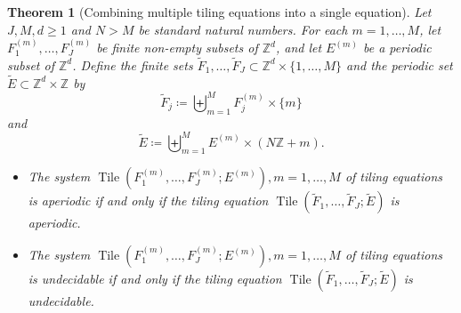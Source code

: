 \documentclass[reqno,a4paper,12pt]{amsart}
\numberwithin{equation}{section}
\numberwithin{figure}{section}
\def\Z{\mathbb{Z}}
\renewcommand\geq{\geqslant}
\newcommand{\Tile}{\operatorname{Tile}}
\theoremstyle{plain}
\newtheorem{theorem}[thm]{Theorem}
\theoremstyle{definition}
\begin{document}
\begin{theorem}[Combining multiple tiling equations into a single equation]\label{combine'}  Let $J,M,d \geq 1$ and $N>M$ be standard natural numbers.  
For each $m=1,\dots,M$, let $F_1^{(m)},\dots,F_J^{(m)}$ be finite non-empty subsets of $\Z^d$, and let $E^{(m)}$ be a periodic subset of $\Z^d$.  Define the finite sets $\tilde F_1,\dots,\tilde F_J \subset \Z^d \times \{1,\dots, M\}$ and the periodic set $\tilde E \subset \Z^d \times \Z$ by 
\begin{equation}\label{fj-stack'}
 \tilde F_j \coloneqq \biguplus_{m=1}^M F_j^{(m)} \times \{m\}
 \end{equation}
and
\begin{equation}\label{e0-stack'}
 \tilde E \coloneqq  \biguplus_{m=1}^M E^{(m)} \times (N\Z+m ).
 \end{equation}
\begin{itemize}
\item[(i)]  The system $\Tile(F_1^{(m)},\dots,F_J^{(m)}; E^{(m)}), m=1,\dots,M$ of tiling equations is aperiodic if and only if the tiling equation
$\Tile(\tilde F_1,\dots,\tilde F_J; \tilde E)$ is aperiodic.
\item[(ii)]  The system $\Tile(F_1^{(m)},\dots,F_J^{(m)}; E^{(m)}), m=1,\dots,M$ of tiling equations is undecidable if and only if the tiling equation
$\Tile(\tilde F_1,\dots,\tilde F_J; \tilde E)$ is undecidable.
\end{itemize}
\end{theorem}
\end{document}
